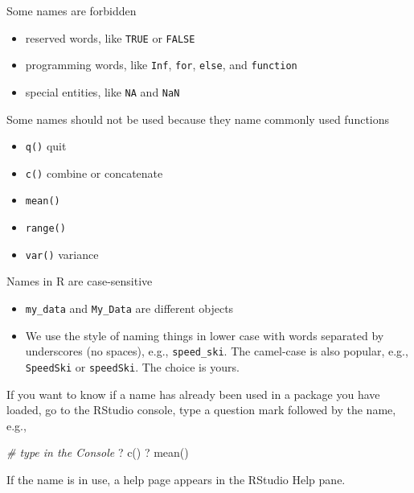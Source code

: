 \documentclass[
]{book}
\newenvironment{Shaded}{\begin{snugshade}}{\end{snugshade}}
\newcommand{\AttributeTok}[1]{\textcolor[rgb]{0.77,0.63,0.00}{#1}}
\newcommand{\CommentTok}[1]{\textcolor[rgb]{0.56,0.35,0.01}{\textit{#1}}}
\newcommand{\StringTok}[1]{\textcolor[rgb]{0.31,0.60,0.02}{#1}}
\providecommand{\tightlist}{%
  \setlength{\itemsep}{0pt}\setlength{\parskip}{0pt}}
\begin{document}
Some names are forbidden

\begin{itemize}
\tightlist
\item
  reserved words, like \texttt{TRUE} or \texttt{FALSE}\\
\item
  programming words, like \texttt{Inf}, \texttt{for}, \texttt{else}, and \texttt{function}\\
\item
  special entities, like \texttt{NA} and \texttt{NaN}
\end{itemize}

Some names should not be used because they name commonly used functions

\begin{itemize}
\tightlist
\item
  \texttt{q()} quit
\item
  \texttt{c()} combine or concatenate
\item
  \texttt{mean()}
\item
  \texttt{range()}
\item
  \texttt{var()} variance
\end{itemize}

Names in R are case-sensitive

\begin{itemize}
\tightlist
\item
  \texttt{my\_data} and \texttt{My\_Data} are different objects
\item
  We use the style of naming things in lower case with words separated by underscores (no spaces), e.g., \texttt{speed\_ski}. The camel-case is also popular, e.g., \texttt{SpeedSki} or \texttt{speedSki}. The choice is yours.
\end{itemize}

If you want to know if a name has already been used in a package you have loaded, go to the RStudio console, type a question mark followed by the name, e.g.,

\begin{Shaded}
\begin{Highlighting}[]
\CommentTok{\# type in the Console}
\StringTok{\textasciigrave{}}\AttributeTok{? c()}\StringTok{\textasciigrave{}} 
\StringTok{\textasciigrave{}}\AttributeTok{? mean()}\StringTok{\textasciigrave{}}
\end{Highlighting}
\end{Shaded}

If the name is in use, a help page appears in the RStudio Help pane.
\end{document}
